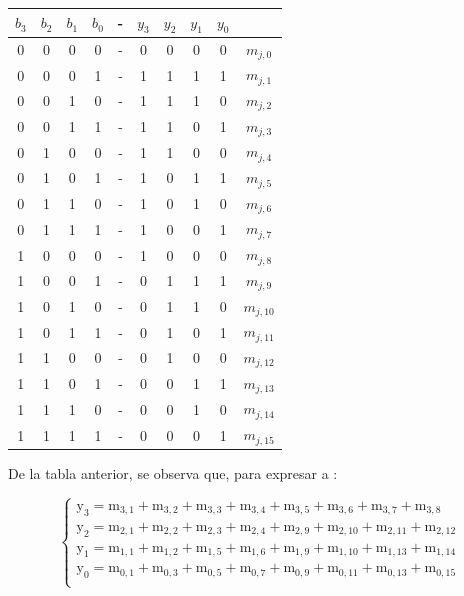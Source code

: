 \documentclass[../../informe/src/main.tex]{subfiles}
\begin{document}
\begin{enumerate}
\begin{table}[H]
\centering
 \begin{tabular}{||c c c c c c c c c c||} 
 \hline
$b_{3}$ & $b_{2}$ & $b_{1}$ & $b_{0}$ & - & $y_{3}$ & $y_{2}$ & $y_{1}$ & $y_{0}$\\ [0.5ex] 
 \hline\hline
 0 & 0 & 0 & 0 & - & 0 & 0 & 0 & 0 & $m_{j,0}$\\
0 & 0 & 0 & 1 & - & 1 & 1 & 1 & 1 & $m_{j,1}$\\
0 & 0 & 1 & 0 & - & 1 & 1 & 1 & 0 & $m_{j,2}$\\
0 & 0 & 1 & 1 & - & 1 & 1 & 0 & 1 & $m_{j,3}$\\
0 & 1 & 0 & 0 & - & 1 & 1 & 0 & 0 & $m_{j,4}$\\
0 & 1 & 0 & 1 & - & 1 & 0 & 1 & 1 & $m_{j,5}$\\
0 & 1 & 1 & 0 & - & 1 & 0 & 1 & 0 & $m_{j,6}$\\
0 & 1 & 1 & 1 & - & 1 & 0 & 0 & 1 & $m_{j,7}$\\
1 & 0 & 0 & 0 & - & 1 & 0 & 0 & 0 & $m_{j,8}$\\
1 & 0 & 0 & 1 & - & 0 & 1 & 1 & 1 & $m_{j,9}$\\
1 & 0 & 1 & 0 & - & 0 & 1 & 1 & 0 & $m_{j,10}$\\
1 & 0 & 1 & 1 & - & 0 & 1 & 0 & 1 & $m_{j,11}$\\
1 & 1 & 0 & 0 & - & 0 & 1 & 0 & 0 & $m_{j,12}$\\
1 & 1 & 0 & 1 & - & 0 & 0 & 1 & 1 & $m_{j,13}$\\
1 & 1 & 1 & 0 & - & 0 & 0 & 1 & 0 & $m_{j,14}$\\
1 & 1 & 1 & 1 & - & 0 & 0 & 0 & 1 & $m_{j,15}$\\[1ex] 
\hline
 \end{tabular}
\end{table}

De la tabla anterior, se observa que, para expresar a :

	 \begin{equation} 
  	   \left\{
	  	    \begin{array}{ll}
		 					\mathrm{y_3} = \mathrm{m_{3,1}+ m_{3,2}+ m_{3,3}+ m_{3,4}+ m_{3,5}+ m_{3,6}+ m_{3,7}+ m_{3,8}} \\
		 					\mathrm{y_2} = \mathrm{m_{2,1}+ m_{2,2}+ m_{2,3}+ m_{2,4}+ m_{2,9}+ m_{2,10}+ m_{2,11}+ m_{2,12}} \\
		 					\mathrm{y_1} = \mathrm{m_{1,1}+ m_{1,2}+ m_{1,5}+ m_{1,6}+ m_{1,9}+ m_{1,10}+ m_{1,13}+ m_{1,14}} \\
		 					\mathrm{y_0} = \mathrm{m_{0,1}+ m_{0,3}+ m_{0,5}+ m_{0,7}+ m_{0,9}+ m_{0,11}+ m_{0,13}+ m_{0,15}} \\
	     	 \end{array}
	     	\right.
 	\end{equation}
 	

\end{enumerate}
\end{document}
